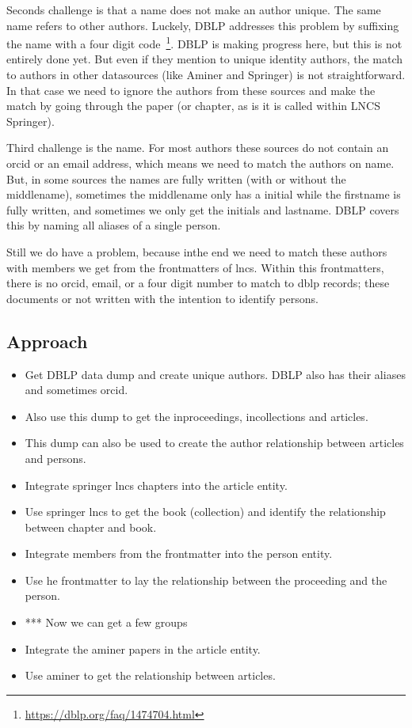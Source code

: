 \documentclass{ou-report}
\begin{document}
Seconds challenge is that a name does not make an author unique. The same name
refers to other authors. Luckely, DBLP addresses this problem by suffixing the
name with a four digit code~\footnote{\url{https://dblp.org/faq/1474704.html}}.
DBLP is making progress here, but this is not entirely done yet. But even if
they mention to unique identity authors, the match to authors in other 
datasources (like Aminer and Springer) is not straightforward. In that case we 
need to ignore the authors from these sources and make the match by going 
through the paper (or chapter, as is it is called within LNCS Springer).

Third challenge is the name. For most authors these sources do not contain an
orcid or an email address, which means we need to match the authors on name.
But, in some sources the names are fully written (with or without the 
middlename), sometimes the middlename only has a initial while the firstname is 
fully written, and sometimes we only get the initials and lastname.
DBLP covers this by naming all aliases of a single person.

Still we do have a problem, because inthe end we need to match these authors
with members we get from the frontmatters of lncs. Within this frontmatters, 
there is no orcid, email, or a four digit number to match to dblp records; these
documents or not written with the intention to identify persons.

\subsection{Approach}
\begin{itemize}
    \item Get DBLP data dump and create unique authors. DBLP also has their 
        aliases and sometimes orcid.
    \item Also use this dump to get the inproceedings, incollections and 
        articles.
    \item This dump can also be used to create the author relationship between 
        articles and persons.
    \item Integrate springer lncs chapters into the article entity.
    \item Use springer lncs to get the book (collection) and identify the 
        relationship between chapter and book.
    \item Integrate members from the frontmatter into the person entity.
    \item Use he frontmatter to lay the relationship between the proceeding and
        the person.
    \item *** Now we can get a few groups
    \item Integrate the aminer papers in the article entity.
    \item Use aminer to get the relationship between articles.
\end{itemize}
\end{document}
